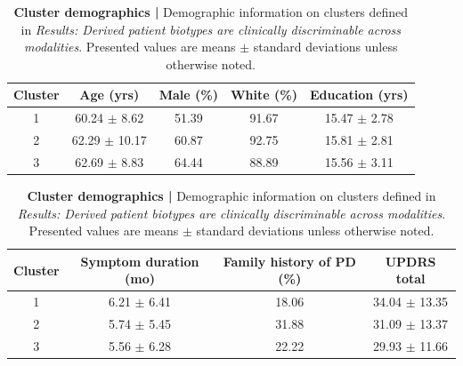 \documentclass[12pt,aps,pra,reprint,showkeys]{revtex4-1}
\begin{document}
\begin{table}[p]
    \caption{
      \textbf{Cluster demographics |}
      Demographic information on clusters defined in \emph{Results: Derived patient biotypes are clinically discriminable across modalities}.
      Presented values are means $\pm$ standard deviations unless otherwise noted.
    }
    \label{supp-table-cluster-demographics}
    \setlength{\tabcolsep}{10pt}
    \renewcommand{\arraystretch}{1.1}
    \begin{center}
      \begin{tabular}{c c c c c}
                                                                                                                           \toprule
        \textbf{Cluster} &  \textbf{Age (yrs)} &  \textbf{Male (\%)} &  \textbf{White (\%)} &  \textbf{Education (yrs)} \\ \midrule
                       1 &    60.24 $\pm$ 8.62 &               51.39 &                91.67 &          15.47 $\pm$ 2.78 \\
                       2 &   62.29 $\pm$ 10.17 &               60.87 &                92.75 &          15.81 $\pm$ 2.81 \\
                       3 &    62.69 $\pm$ 8.83 &               64.44 &                88.89 &          15.56 $\pm$ 3.11 \\
      \end{tabular}
    \end{center}
    \begin{center}
      \begin{tabular}{c c c c}
                                                                                                                             \toprule
        \textbf{Cluster} &  \textbf{Symptom duration (mo)} &  \textbf{Family history of PD (\%)} &  \textbf{UPDRS total}  \\ \midrule
                       1 &                 6.21 $\pm$ 6.41 &                               18.06 &     34.04 $\pm$ 13.35  \\
                       2 &                 5.74 $\pm$ 5.45 &                               31.88 &     31.09 $\pm$ 13.37  \\
                       3 &                 5.56 $\pm$ 6.28 &                               22.22 &     29.93 $\pm$ 11.66  \\ \bottomrule
      \end{tabular}
    \end{center}
\end{table}
\end{document}

